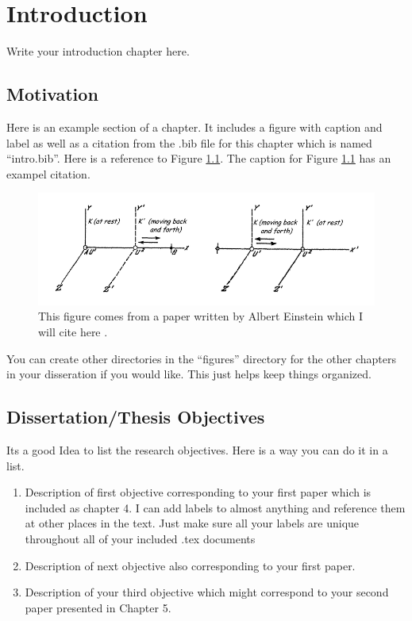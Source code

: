 \chapter{Introduction \label{chp1}}

Write your introduction chapter here.

\section{Motivation}

Here is an example section of a chapter. It includes a figure with caption and
label as well as a citation from the .bib file for this chapter which is named
``intro.bib''. Here is a reference to Figure \ref{exampleFig}.  The caption for
Figure \ref{exampleFig} has an exampel citation.

\begin{figure}[!ht]
    \centerline{\includegraphics[width=5.0in]{figures/chapter1/exampleFig.png}}
    \caption{This figure comes from a paper written by Albert Einstein which I
    will cite here \cite{einstein1916foundation}.  \label{exampleFig}}
\end{figure}

You can create other directories in the ``figures'' directory for the other
chapters in your disseration if you would like. This just helps keep things
organized.


\section{Dissertation/Thesis Objectives}

Its a good Idea to list the research objectives. Here is a way you can do it
in a list.
\begin{enumerate}
        \item Description of first objective corresponding to your first paper
            which is included as chapter 4. I can add labels to almost anything
            and reference them at other places in the text. Just make sure all
            your labels are unique throughout all of your included .tex
            documents \label{obj1}
        \item Description of next objective also corresponding to your first
            paper. \label{obj2}
        \item Description of your third objective which might correspond to your
            second paper presented in Chapter 5. \label{obj3}
\end{enumerate}

